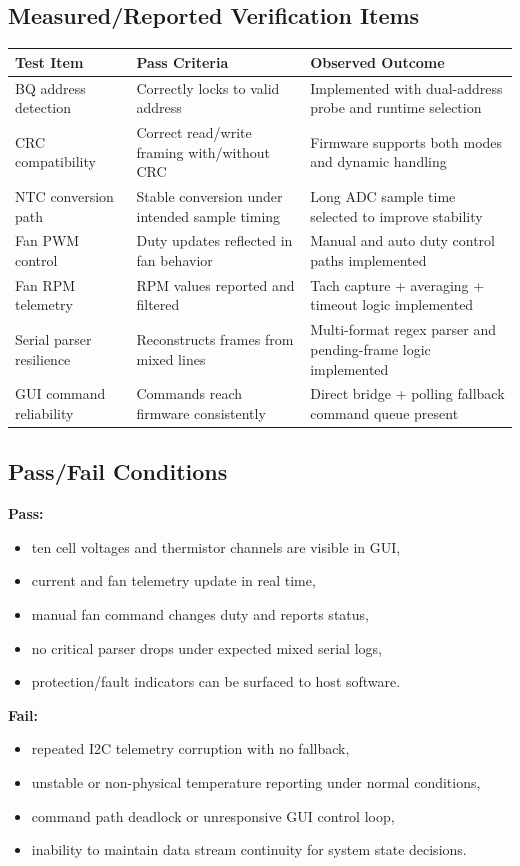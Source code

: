 \documentclass[12pt]{article}
\begin{document}
\subsection{Measured/Reported Verification Items}
\begin{longtable}{p{5cm}p{4cm}p{5cm}}
\toprule
\textbf{Test Item} & \textbf{Pass Criteria} & \textbf{Observed Outcome} \\
\midrule
BQ address detection & Correctly locks to valid address & Implemented with dual-address probe and runtime selection \\
CRC compatibility & Correct read/write framing with/without CRC & Firmware supports both modes and dynamic handling \\
NTC conversion path & Stable conversion under intended sample timing & Long ADC sample time selected to improve stability \\
Fan PWM control & Duty updates reflected in fan behavior & Manual and auto duty control paths implemented \\
Fan RPM telemetry & RPM values reported and filtered & Tach capture + averaging + timeout logic implemented \\
Serial parser resilience & Reconstructs frames from mixed lines & Multi-format regex parser and pending-frame logic implemented \\
GUI command reliability & Commands reach firmware consistently & Direct bridge + polling fallback command queue present \\
\bottomrule
\end{longtable}

\subsection{Pass/Fail Conditions}
\textbf{Pass:}
\begin{itemize}[leftmargin=1.2cm]
    \item ten cell voltages and thermistor channels are visible in GUI,
    \item current and fan telemetry update in real time,
    \item manual fan command changes duty and reports status,
    \item no critical parser drops under expected mixed serial logs,
    \item protection/fault indicators can be surfaced to host software.
\end{itemize}

\textbf{Fail:}
\begin{itemize}[leftmargin=1.2cm]
    \item repeated I2C telemetry corruption with no fallback,
    \item unstable or non-physical temperature reporting under normal conditions,
    \item command path deadlock or unresponsive GUI control loop,
    \item inability to maintain data stream continuity for system state decisions.
\end{itemize}
\end{document}
